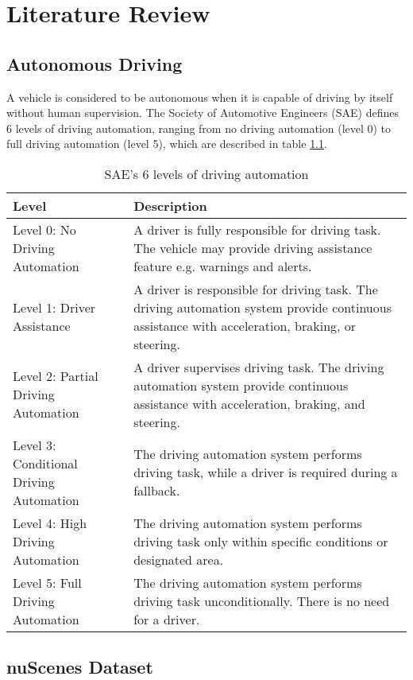 \chapter{Literature Review}

\section{Autonomous Driving}

A vehicle is considered to be autonomous when it is capable of driving by itself without human supervision. \cite{Springer_AutonomousDriving} The Society of Automotive Engineers (SAE) defines 6 levels of driving automation, ranging from no driving automation (level 0) to full driving automation (level 5)\cite{SAE_AutomationLevels}, which are described in table \ref{tab:sae-driving-automation}.


\begin{table}[h]
\begin{tabularx}{\textwidth}{p{4cm}|X}
\textbf{Level} & \textbf{Description} \\
\hline
Level 0: No Driving Automation & 
A driver is fully responsible for driving task. The vehicle may provide driving assistance feature e.g. warnings and alerts.\\ 
\hline
Level 1: Driver Assistance &
A driver is responsible for driving task. The driving automation system provide continuous assistance with acceleration, braking, or steering.\\
\hline
Level 2: Partial Driving Automation &
A driver supervises driving task. The driving automation system provide continuous assistance with acceleration, braking, and steering.\\
\hline
Level 3: Conditional Driving Automation &
The driving automation system performs driving task, while a driver is required during a fallback.\\
\hline
Level 4: High Driving Automation &
The driving automation system performs driving task only within specific conditions or designated area.\\
\hline
Level 5: Full Driving Automation &
The driving automation system performs driving task unconditionally. There is no need for a driver.

\end{tabularx}
\caption{SAE's 6 levels of driving automation}
\label{tab:sae-driving-automation}
\end{table}


\section{nuScenes Dataset}

